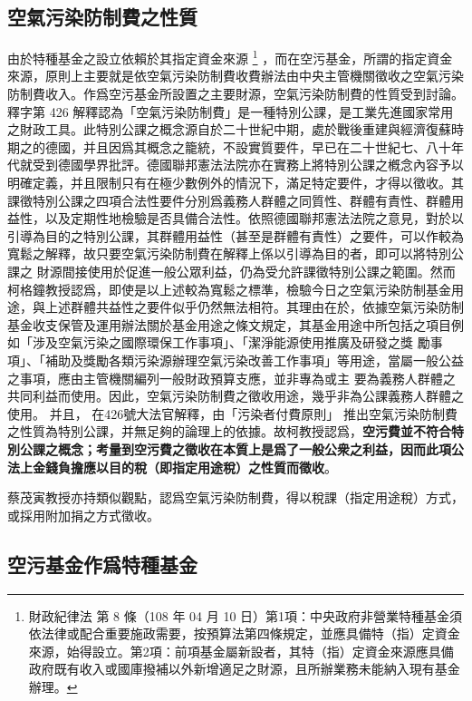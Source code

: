 \documentclass[12pt,a4paper]{article}
\begin{document}
\subsection{空氣污染防制費之性質}
由於特種基金之設立依賴於其指定資金來源
\footnote{財政紀律法 第 8 條（108 年 04 月 10 日）第1項：中央政府非營業特種基金須依法律或配合重要施政需要，按預算法第四條規定，並應具備特（指）定資金來源，始得設立。第2項：前項基金屬新設者，其特（指）定資金來源應具備政府既有收入或國庫撥補以外新增適足之財源，且所辦業務未能納入現有基金辦理。}
，而在空污基金，所謂的指定資金來源，原則上主要就是依空氣污染防制費收費辦法由中央主管機關徵收之空氣污染防制費收入。作爲空污基金所設置之主要財源，空氣污染防制費的性質受到討論。釋字第 426 解釋認為「空氣污染防制費」是一種特別公課，是工業先進國家常用之財政工具。此特別公課之概念源自於二十世紀中期，處於戰後重建與經濟復蘇時期之的德國，并且因爲其概念之籠統，不設實質要件，早已在二十世紀七、八十年代就受到德國學界批評。德國聯邦憲法法院亦在實務上將特別公課之槪念內容予以明確定義，并且限制只有在極少數例外的情況下，滿足特定要件，才得以徵收。其課徵特別公課之四項合法性要件分別爲義務人群體之同質性、群體有責性、群體用益性，以及定期性地檢驗是否具備合法性。依照德國聯邦憲法法院之意見，對於以引導為目的之特別公課，其群體用益性（甚至是群體有責性）之要件，可以作較為 寬鬆之解釋，故只要空氣污染防制費在解釋上係以引導為目的者，即可以將特別公課之 財源間接使用於促進一般公眾利益，仍為受允許課徵特別公課之範圍。然而柯格鐘教授認爲，即使是以上述較為寬鬆之標準，檢驗今日之空氣污染防制基金用途，與上述群體共益性之要件似乎仍然無法相符。其理由在於，依據空氣污染防制基金收支保管及運用辦法關於基金用途之條文規定，其基金用途中所包括之項目例如「涉及空氣污染之國際環保工作事項」、「潔淨能源使用推廣及研發之獎 勵事項」、「補助及獎勵各類污染源辦理空氣污染改善工作事項」等用途，當屬一般公益之事項，應由主管機關編列一般財政預算支應，並非專為或主 要為義務人群體之共同利益而使用。因此，空氣污染防制費之徵收用途，幾乎非為公課義務人群體之使用。
并且，
在426號大法官解釋，由「污染者付費原則」 推出空氣污染防制費之性質為特別公課，并無足夠的論理上的依據。故柯教授認爲，\textbf{空污費並不符合特別公課之概念；考量到空污費之徵收在本質上是爲了一般公衆之利益，因而此項公法上金錢負擔應以目的稅（即指定用途稅）之性質而徵收}。

蔡茂寅教授亦持類似觀點，認爲空氣污染防制費，得以稅課（指定用途稅）方式，或採用附加捐之方式徵收。



\subsection{空污基金作爲特種基金}
\end{document}
